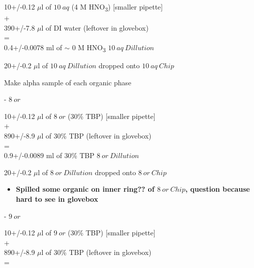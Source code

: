 \documentclass[idxtotoc,hyperref,openany,oneside]{labbook} %
\newcommand{\cmark}{\ding{51}}%
\newcommand{\done}{\rlap{$\square$}{\raisebox{2pt}{\large\hspace{1pt}\cmark}}%
  \hspace{-2.5pt}}
\newcommand{\tsbs}{\textsubscript}
\begin{document}
\begin{todolist}
\begin{todolist}
\end{todolist}
\begin{center}
10+/-0.12 $\mu$l of $\boxed{10\ aq}$ (4 M HNO\tsbs{3}) [smaller pipette]\\
+\\
390+/-7.8 $\mu$l of DI water (leftover in glovebox)\\
=\\
0.4+/-0.0078 ml of $\sim$ 0 M HNO\tsbs{3} $\boxed{10\ aq\ Dillution}$
\end{center}
\vspace{0.3cm}
\begin{center}
  20+/-0.2 $\mu$l of $\boxed{10\ aq\ Dillution}$ dropped onto
  $\boxed{10\ aq\ Chip}$
\end{center}


\item[\done]{Make alpha sample of each organic phase}
\begin{todolist}
\item[\done]{- $\boxed{8\ or}$}
\end{todolist}
\begin{center}
10+/-0.12 $\mu$l of $\boxed{8\ or}$ (30\% TBP) [smaller pipette]\\
+\\
890+/-8.9 $\mu$l of 30\% TBP (leftover in glovebox)\\
=\\
0.9+/-0.0089 ml of 30\% TBP $\boxed{8\ or\ Dillution}$
\end{center}
\vspace{0.3cm}
\begin{center}
  20+/-0.2 $\mu$l of $\boxed{8\ or\ Dillution}$ dropped onto
  $\boxed{8\ or\ Chip}$
\end{center}
\begin{itemize}
\item{\textbf{Spilled some organic on inner ring??
    of $\boxed{8\ or\ Chip}$, question because hard to see in
    glovebox}}
\end{itemize}
\begin{todolist}
\item[\done]{- $\boxed{9\ or}$}
\end{todolist}
\begin{center}
10+/-0.12 $\mu$l of $\boxed{9\ or}$ (30\% TBP) [smaller pipette]\\
+\\
890+/-8.9 $\mu$l of 30\% TBP (leftover in glovebox)\\
=\\

\end{center}
\end{todolist}
\end{document}
